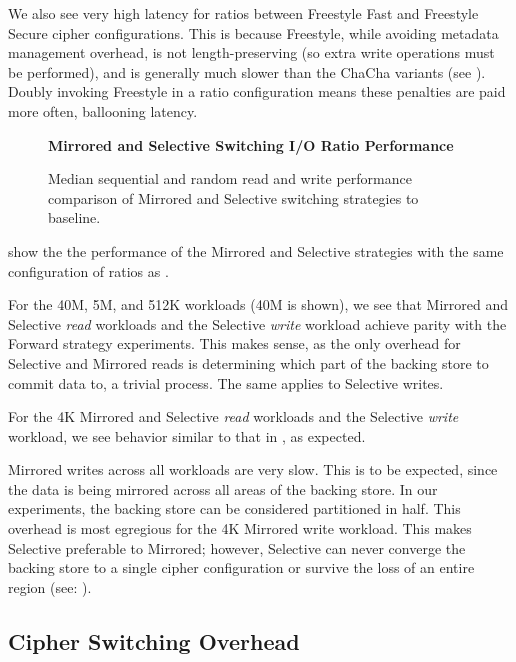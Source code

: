 We also see very high latency for ratios between Freestyle Fast and Freestyle
Secure cipher configurations. This is because Freestyle, while avoiding metadata
management overhead, is not length-preserving (so extra write operations must be
performed), and is generally much slower than the ChaCha variants (see
). Doubly invoking Freestyle in a ratio configuration
means these penalties are paid more often, ballooning latency.

\begin{figure}[ht]
  \textbf{Mirrored and Selective Switching I/O Ratio Performance}\par\medskip
  \centering
  {} \caption{Median sequential
  and random read and write performance comparison of Mirrored and Selective
  switching strategies to baseline.}
 \label{fig:mirrored-selective-baseline}
\end{figure}

 show the the performance of the Mirrored
and Selective strategies with the same configuration of ratios as
.

For the 40M, 5M, and 512K workloads (40M is shown), we see that Mirrored and
Selective \emph{read} workloads and the Selective \emph{write} workload achieve
parity with the Forward strategy experiments. This makes sense, as the only
overhead for Selective and Mirrored reads is determining which part of the
backing store to commit data to, a trivial process. The same applies to
Selective writes.

For the 4K Mirrored and Selective \emph{read} workloads and the Selective
\emph{write} workload, we see behavior similar to that in
, as expected.

Mirrored writes across all workloads are very slow. This is to be expected,
since the data is being mirrored across all areas of the backing store. In our
experiments, the backing store can be considered partitioned in half. This
overhead is most egregious for the 4K Mirrored write workload. This makes
Selective preferable to Mirrored; however, Selective can never converge the
backing store to a single cipher configuration or survive the loss of an entire
region (see: ).

\subsection{Cipher Switching Overhead}

